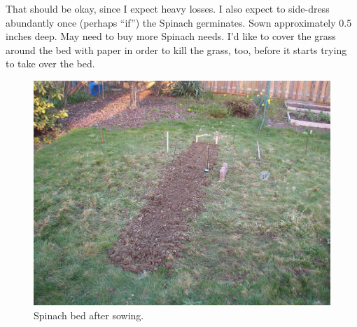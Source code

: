 \documentclass{article}
\begin{document}
That should be okay, since I expect heavy losses. I also expect to side-dress abundantly once (perhaps ``if'') the Spinach germinates. Sown approximately 0.5 inches deep. May need to buy more Spinach needs. I'd like to cover the grass around the bed with paper in order to kill the grass, too, before it starts trying to take over the bed. \\
\begin{figure}
\protect \includegraphics[scale=0.20]{pics/0317_bed.jpg}
\caption{Spinach bed after sowing.}
\end{figure}
\end{document}
